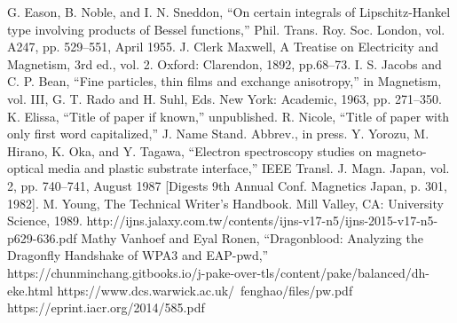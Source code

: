 \documentclass[journal]{IEEEtran}
\begin{document}
\begin{thebibliography}{00}
 G. Eason, B. Noble, and I. N. Sneddon, ``On certain integrals of Lipschitz-Hankel type involving products of Bessel functions,'' Phil. Trans. Roy. Soc. London, vol. A247, pp. 529--551, April 1955.
 J. Clerk Maxwell, A Treatise on Electricity and Magnetism, 3rd ed., vol. 2. Oxford: Clarendon, 1892, pp.68--73.
 I. S. Jacobs and C. P. Bean, ``Fine particles, thin films and exchange anisotropy,'' in Magnetism, vol. III, G. T. Rado and H. Suhl, Eds. New York: Academic, 1963, pp. 271--350.
 K. Elissa, ``Title of paper if known,'' unpublished.
 R. Nicole, ``Title of paper with only first word capitalized,'' J. Name Stand. Abbrev., in press.
 Y. Yorozu, M. Hirano, K. Oka, and Y. Tagawa, ``Electron spectroscopy studies on magneto-optical media and plastic substrate interface,'' IEEE Transl. J. Magn. Japan, vol. 2, pp. 740--741, August 1987 [Digests 9th Annual Conf. Magnetics Japan, p. 301, 1982].
 M. Young, The Technical Writer's Handbook. Mill Valley, CA: University Science, 1989.
 http://ijns.jalaxy.com.tw/contents/ijns-v17-n5/ijns-2015-v17-n5-p629-636.pdf
 Mathy Vanhoef and Eyal Ronen, ``Dragonblood: Analyzing the Dragonfly Handshake of WPA3 and EAP-pwd,''
 https://chunminchang.gitbooks.io/j-pake-over-tls/content/pake/balanced/dh-eke.html
 https://www.dcs.warwick.ac.uk/~fenghao/files/pw.pdf
 https://eprint.iacr.org/2014/585.pdf
\end{thebibliography}
\vspace{12pt}
\end{document}
